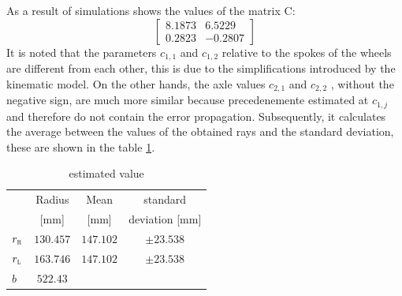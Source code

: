  As a result of simulations shows the values of the matrix C:
\begin{equation}
\label{eq:Cresult}
	\begin{bmatrix}
		8.1873  &  6.5229\\
    	0.2823 &  -0.2807
	\end{bmatrix}
\end{equation}
It is noted that the parameters $c_ {1,1}$ and $c_ {1,2}$ relative to the spokes of the wheels are different from each other, this is due to the simplifications introduced by the kinematic model. On the other hands, the axle values $c_ {2,1}$ and $c_ {2,2}$ , without the negative sign, are much more similar because precedenemente estimated at $c_{1,j}$ and therefore do not contain the error propagation.
Subsequently, it calculates the average between the values of the obtained rays and the standard deviation, these are shown in the table \ref{tab:recapvalue}.
\begin{table}[!h]
\centering
	\begin{tabular}{lccc}
		\hline
								& Radius 	& Mean 	& standard  \\
								&	[mm]	& [mm]	& deviation [mm]\\
		\hline
		$r_\textsc{r}$	&	$130.457$		& $147.102	$		&	$\pm23.538$\\
		$r_\textsc{l}$	&	$163.746$		& $147.102	$		&	$\pm23.538$\\
		$b$					&	$522.43$\\
		\hline
\end{tabular}
\caption{estimated value}
\label{tab:recapvalue}
\end{table}

